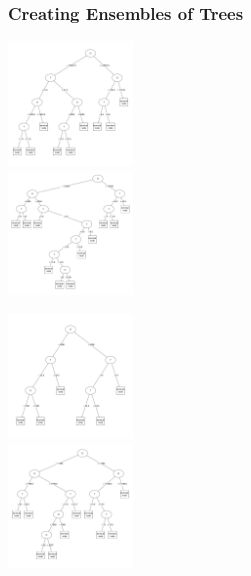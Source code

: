 \documentclass{beamer}\usepackage[]{graphicx}\usepackage[]{color}
\begin{document}
\begin{frame}
\frametitle{Creating Ensembles of Trees}



\begin{multicols}{2}

\begin{center}

\includegraphics[width = 1.3in]{figure/boot_tree_1.pdf} \\
\includegraphics[width = 1.3in]{figure/boot_tree_2.pdf}

\end{center}

\columnbreak

\begin{center}

\includegraphics[width = 1.3in]{figure/boot_tree_3.pdf} \\
\includegraphics[width = 1.3in]{figure/boot_tree_4.pdf}

\end{center}

\end{multicols}

\end{frame}
\end{document}
